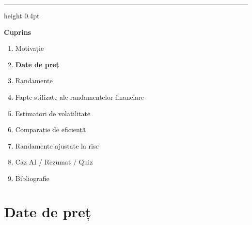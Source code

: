 \documentclass[9pt, aspectratio=169, t]{beamer}
\theoremstyle{definition}
\begin{document}
{
\begin{frame}{}
    {\color{FooterGray}\hrule height 0.4pt}
    \vspace{0.1cm}
    {\Large\textcolor{IDAred}{\textbf{Cuprins}}}
    \vspace{0.2cm}
    \begin{enumerate}
        \item Motivație \checkmark
        \item \textbf{Date de preț}
        \item Randamente
        \item Fapte stilizate ale randamentelor financiare
        \item Estimatori de volatilitate
        \item Comparație de eficiență
        \item Randamente ajustate la risc
        \item Caz AI / Rezumat / Quiz
        \item Bibliografie
    \end{enumerate}
\end{frame}
}

\section{Date de preț}
\end{document}
